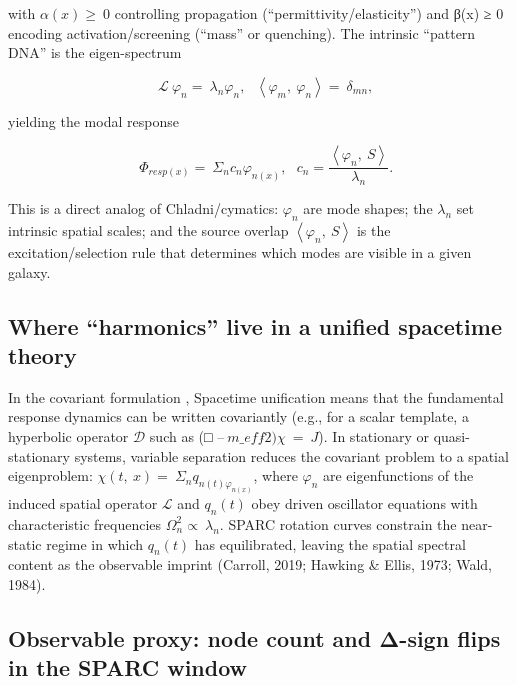 \documentclass[11pt]{article}
\begin{document}
with \(\alpha(x) \geq \ 0\) controlling propagation (``permittivity/elasticity'') and β(x) ≥ 0 encoding activation/screening (``mass'' or quenching). The intrinsic ``pattern DNA'' is the eigen-spectrum

\[\ \ \ \ \mathcal{L}\ \varphi_{n} = \ \lambda_{n}\varphi_{n},\ \ \ \left\langle \varphi_{m},\ \varphi_{n} \right\rangle = \ \delta_{mn},\]

yielding the modal response

\[\ \ \ \ \Phi_{resp(x)} = \ \Sigma_{n}c_{n}\varphi_{n(x)},\ \ \ c_{n} = \frac{\left\langle \varphi_{n},\ S \right\rangle}{\lambda_{n}}.\]

This is a direct analog of Chladni/cymatics: \(\varphi_{n}\) are mode shapes; the \(\lambda_{n}\) set intrinsic spatial scales; and the source overlap \(\left\langle \varphi_{n},\ S \right\rangle\) is the excitation/selection rule that determines which modes are visible in a given galaxy.

\subsection{Where ``harmonics'' live in a unified spacetime theory}\label{d.3-where-harmonics-live-in-a-unified-spacetime-theory}

In the covariant formulation \citep{HawkingEllis1973, Wald1984GR, Carroll2019}, Spacetime unification means that the fundamental response dynamics can be written covariantly (e.g., for a scalar template, a hyperbolic operator \(\mathcal{D}\) such as (□ \(–\ m\_ eff\hat{}2)\chi\  = \ J\)). In stationary or quasi-stationary systems, variable separation reduces the covariant problem to a spatial eigenproblem: \(\chi(t,\ x) = \ \Sigma_{n}q_{n(t)\varphi_{n(x)}}\), where \(\varphi_{n}\) are eigenfunctions of the induced spatial operator \(\mathcal{L}\) and \(q_{n}(t)\) obey driven oscillator equations with characteristic frequencies \(\Omega_{n}^{2} \propto \ \lambda_{n}\). SPARC rotation curves constrain the near-static regime in which \(q_{n}(t)\) has equilibrated, leaving the spatial spectral content as the observable imprint (Carroll, 2019; Hawking \& Ellis, 1973; Wald, 1984).

\subsection{Observable proxy: node count and Δ-sign flips in the SPARC window}\label{d.4-observable-proxy-node-count-and-ux3b4-sign-flips-in-the-sparc-window}
\end{document}
